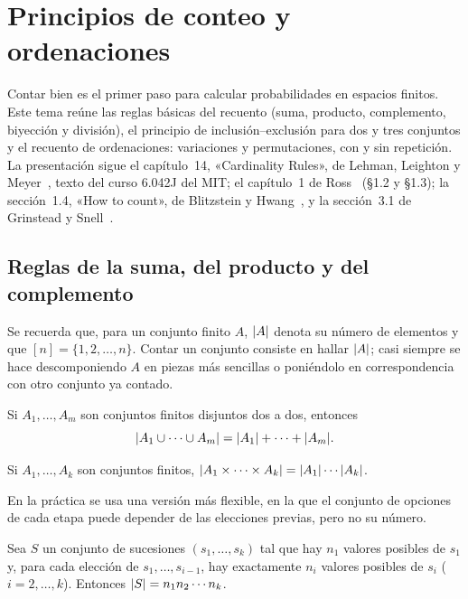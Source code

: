 \chapter{Principios de conteo y ordenaciones}
\label{tema:1}

Contar bien es el primer paso para calcular probabilidades en espacios finitos. Este tema reúne las reglas básicas del recuento (suma, producto, complemento, biyección y división), el principio de inclusión--exclusión para dos y tres conjuntos y el recuento de ordenaciones: variaciones y permutaciones, con y sin repetición. La presentación sigue el capítulo~14, «Cardinality Rules», de Lehman, Leighton y Meyer~\cite{mcs}, texto del curso 6.042J del MIT; el capítulo~1 de Ross~\cite{ross} (§1.2 y §1.3); la sección~1.4, «How to count», de Blitzstein y Hwang~\cite{bh}, y la sección~3.1 de Grinstead y Snell~\cite{gs}.

\section{Reglas de la suma, del producto y del complemento}

Se recuerda que, para un conjunto finito $A$, $\lvert A\rvert$ denota su número de elementos y que $[n]=\{1,2,\dots,n\}$. Contar un conjunto consiste en hallar $\lvert A\rvert$; casi siempre se hace descomponiendo $A$ en piezas más sencillas o poniéndolo en correspondencia con otro conjunto ya contado.

\begin{proposicion}\label{prop:t1-suma}
Si $A_1,\dots,A_m$ son conjuntos finitos disjuntos dos a dos, entonces
\[
\lvert A_1\cup\dots\cup A_m\rvert=\lvert A_1\rvert+\dots+\lvert A_m\rvert.
\]
\end{proposicion}

\begin{proposicion}\label{prop:t1-producto}
Si $A_1,\dots,A_k$ son conjuntos finitos, $\lvert A_1\times\dots\times A_k\rvert=\lvert A_1\rvert\cdots\lvert A_k\rvert$.
\end{proposicion}

En la práctica se usa una versión más flexible, en la que el conjunto de opciones de cada etapa puede depender de las elecciones previas, pero no su número.

\begin{teorema}\label{teo:t1-producto-gen}
Sea $S$ un conjunto de sucesiones $(s_1,\dots,s_k)$ tal que hay $n_1$ valores posibles de $s_1$ y, para cada elección de $s_1,\dots,s_{i-1}$, hay exactamente $n_i$ valores posibles de $s_i$ ($i=2,\dots,k$). Entonces $\lvert S\rvert=n_1n_2\cdots n_k$.
\end{teorema}

